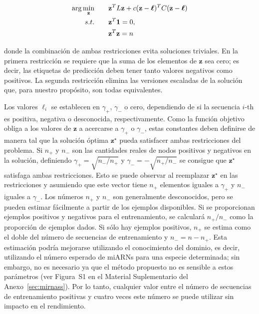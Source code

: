 \begin{equation}
	\begin{split}
		\arg\min_{\mathbf{z}} & \qquad \mathbf{z}^TL\mathbf{z} +c(\mathbf{z}-\boldsymbol\ell)^TC(\mathbf{z}-\boldsymbol\ell) \\
		s.t. & \qquad \mathbf{z}^T\mathbf{1} = 0, \\
		     & \qquad \mathbf{z}^T\mathbf{z} = n
	\end{split}
\end{equation}

\noindent donde la combinación de ambas restricciones evita soluciones triviales. En la primera restricción se requiere que la suma de los elementos de
$\mathbf{z}$ sea cero; es decir, las etiquetas de predicción deben tener tanto valores negativos como positivos. La segunda restricción elimina las versiones
escaladas de la solución que, para nuestro propósito, son todas equivalentes.

Los valores $\ell_{i}$ se establecen en $\gamma_{+}$, $\gamma_{-}$ o cero, dependiendo de si la secuencia $ i $-th es positiva, negativa o desconocida,
respectivamente. Como la función objetivo obliga a los valores de $\mathbf{z}$ a acercarse a $\gamma_{+}$ o $\gamma_{-}$, estas constantes deben definirse de
manera tal que la solución óptima $\mathbf{z}^\star$ pueda satisfacer ambas restricciones del problema. Si $n_{+}$ y $n_{-}$ son las cantidades reales de nodos
positivos y negativos en la solución, definiendo $\gamma_{+} = \sqrt{n_{-}/n_{+}}$ y $\gamma_{-}=-\sqrt{n_{+}/n_{-}}$ se consigue que $\mathbf{z}^\star$
satisfaga ambas restricciones. Esto se puede observar al reemplazar $\mathbf{z}^\star$ en las restricciones y asumiendo que este vector tiene $n_{+}$ elementos
iguales a $\gamma_{+}$ y $n_{-}$ iguales a $\gamma_{-}$. Los números $n_{+}$ y $n_{-}$ son generalmente desconocidos, pero se pueden estimar fácilmente a partir
de los ejemplos disponibles. Si se proporcionan ejemplos positivos y negativos para el entrenamiento, se calculará $n_{+}/n_{-}$ como la proporción de ejemplos
dados. Si sólo hay ejemplos positivos, $n_{+}$ se estima como el doble del número de secuencias de entrenamiento y $n_{-} = n - n_{+}$. Esta estimación podría
mejorarse utilizando el conocimiento del dominio, es decir, utilizando el número esperado de miARNs para una especie determinada; sin embargo, no es necesario
ya que el método propuesto no es sensible a estos parámetros (ver Figura~S1 en el Material Suplementario del Anexo~\ref{sec:mirnass}). Por lo tanto, cualquier
valor entre el número de secuencias de entrenamiento positivas y cuatro veces este número se puede utilizar sin impacto en el rendimiento.

